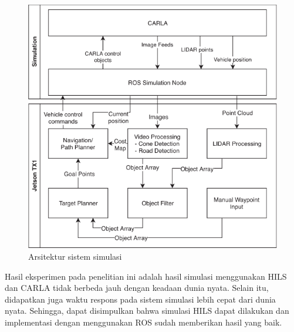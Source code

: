 \begin{figure}[h!]
	\centering
	\includegraphics[width=1.0\textwidth]{resources/chapter-2/carla-jetson-arch.png}
	\caption{Arsitektur sistem simulasi \parencite{brogle_CarlaHILS}}
	\label{chapter-2-carla-jetson-arch}
\end{figure}

Hasil eksperimen pada penelitian ini adalah hasil simulasi menggunakan HILS dan
CARLA tidak berbeda jauh dengan keadaan dunia nyata. Selain itu, didapatkan juga
waktu respons pada sistem simulasi lebih cepat dari dunia nyata. Sehingga, dapat
disimpulkan bahwa simulasi HILS dapat dilakukan dan implementasi dengan
menggunakan ROS sudah memberikan hasil yang baik.
